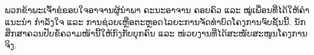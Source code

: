 
\noindent ພວກຂ້າພະເຈົ້າຂໍຂອບໃຈອາຈານຜູ້ນຳພາ ຄະນະອາຈານ ຄອບຄົວ ແລະ ໝູ່ເພື່ອນທີ່ໄດ້ໃຫ້ຄຳແນະນຳ ກຳລັງໃຈ ແລະ ການຊ່ວຍເຫຼືອຕະຫຼອດໄລຍະການຈັດທຳບົດໂຄງການຈົບຊັ້ນນີ້. ນັກສຶກສາຄວນປັບຂໍ້ຄວາມໜ້ານີ້ໃຫ້ກົງກັບບຸກຄົນ ແລະ ໜ່ວຍງານທີ່ໄດ້ສະໜັບສະໜູນໂຄງການຈິງ.

\vspace{1.5cm}
\begin{flushright}
\studentAlo\\
\studentBlo\\
\submissiondate
\end{flushright}

\clearpage
